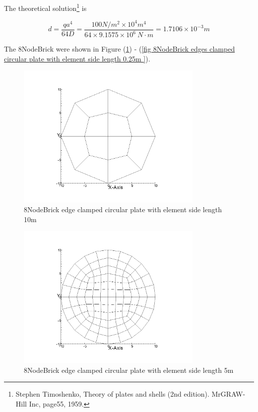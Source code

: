 \documentclass[fleqn,11pt,letter]{article}
\begin{document}
The theoretical solution\footnote{Stephen Timoshenko, Theory of plates and shells (2nd edition). MrGRAW-Hill Inc, page55, 1959.} is 

\begin{equation}
  d= \frac{q a^4}{64D}=\frac{100 N/m^2 \times 10^4 m^4}{64 \times 9.1575 \times 10^6 \ N\cdot m}=1.7106\times 10^{-3} m
\end{equation}



The 8NodeBrick were shown in Figure (\ref{fig 8NodeBrick edges clamped circular plate with element side length 10m }) - (\ref{fig 8NodeBrick edges clamped circular plate with element side length 0.25m }). 




\begin{figure}[H]
  \centering
  \includegraphics[width=9cm]{../Figure_files/8NodeBrick/circular_plate1.png}
  \caption{8NodeBrick edge clamped circular plate with element side length 10m }
  \label{fig 8NodeBrick edges clamped circular plate with element side length 10m }
\end{figure}

\newpage

\begin{figure}[H]
  \centering
  \includegraphics[width=9cm]{../Figure_files/8NodeBrick/circular_plate2.png}
  \caption{8NodeBrick edge clamped circular plate with element side length 5m }
  \label{fig 8NodeBrick edges clamped circular plate with element side length 5m }
\end{figure}
\end{document}
